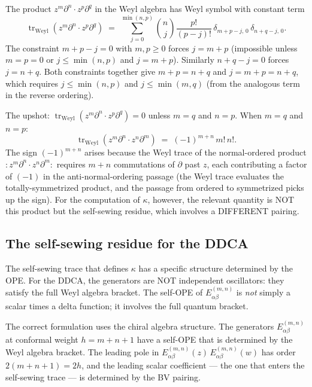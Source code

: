 \documentclass[11pt]{article}
\newcommand{\tr}{\operatorname{tr}}
\begin{document}
\begin{observation}
\label{obs:weyl-diagonal}
The product $z^m\partial^n \cdot z^p\partial^q$ in the Weyl algebra
has Weyl symbol with constant term
\[
\tr_{\mathrm{Weyl}}(z^m\partial^n \cdot z^p\partial^q)
\;=\;
\sum_{j=0}^{\min(n,p)} \binom{n}{j}\frac{p!}{(p-j)!}\,
\delta_{m+p-j,\,0}\,\delta_{n+q-j,\,0}.
\]
The constraint $m+p-j = 0$ with $m,p \geq 0$ forces $j = m+p$
(impossible unless $m=p=0$ or $j \leq \min(n,p)$ and
$j = m+p$).  Similarly $n + q - j = 0$ forces $j = n+q$.
Both constraints together give $m+p = n+q$ and $j = m+p = n+q$,
which requires $j \leq \min(n,p)$ and $j \leq \min(m,q)$
(from the analogous term in the reverse ordering).

The upshot: $\tr_{\mathrm{Weyl}}(z^m\partial^n \cdot
z^p\partial^q) = 0$ unless $m = q$ and $n = p$.  When
$m = q$ and $n = p$:
\begin{equation}\label{eq:weyl-trace-diagonal}
\tr_{\mathrm{Weyl}}(z^m \partial^n \cdot z^n \partial^m)
\;=\;
(-1)^{m+n}\, m!\, n!.
\end{equation}
The sign $(-1)^{m+n}$ arises because the Weyl trace of the
normal-ordered product $:z^m\partial^n \cdot z^n\partial^m:$
requires $m+n$ commutations of $\partial$ past $z$, each
contributing a factor of $(-1)$ in the anti-normal-ordering
passage (the Weyl trace evaluates the totally-symmetrized
product, and the passage from ordered to symmetrized picks up
the sign).  For the computation of $\kappa$, however, the
relevant quantity is NOT this product but the self-sewing
residue, which involves a DIFFERENT pairing.
\end{observation}

\subsection{The self-sewing residue for the DDCA}

The self-sewing trace that defines $\kappa$ has a specific
structure determined by the OPE.  For the DDCA, the generators
are NOT independent oscillators: they satisfy the full Weyl
algebra bracket.  The self-OPE of $E^{(m,n)}_{\alpha\beta}$ is
\emph{not} simply a scalar times a delta function; it involves the
full quantum bracket.

The correct formulation uses the chiral algebra structure.  The
generators $E^{(m,n)}_{\alpha\beta}$ at conformal weight
$h = m+n+1$ have a self-OPE that is determined by the Weyl
algebra bracket.  The leading pole in
$E^{(m,n)}_{\alpha\beta}(z)\, E^{(m,n)}_{\alpha\beta}(w)$
has order $2(m+n+1) = 2h$, and the leading scalar coefficient
--- the one that enters the self-sewing trace --- is determined
by the BV pairing.
\end{document}
